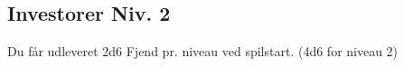 \subsection{Investorer Niv. 2}
Du får udleveret 2d6 Fjend pr. niveau ved spilstart. (4d6 for niveau 2)\\